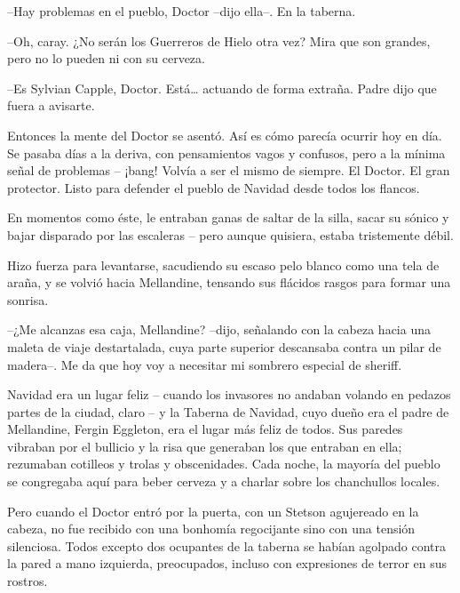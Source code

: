 --Hay problemas en el pueblo, Doctor --dijo ella--. En la taberna.

--Oh, caray. ¿No serán los Guerreros de Hielo otra vez? Mira que son grandes, pero no lo pueden ni con su cerveza.

--Es Sylvian Capple, Doctor. Está… actuando de forma extraña. Padre dijo que fuera a avisarte.

Entonces la mente del Doctor se asentó. Así es cómo parecía ocurrir hoy en día. Se pasaba días a la deriva, con pensamientos vagos y confusos, pero a la mínima señal de problemas – ¡bang! Volvía a ser el mismo de siempre. El Doctor. El gran protector. Listo para defender el pueblo de Navidad desde todos los flancos.

En momentos como éste, le entraban ganas de saltar de la silla, sacar su sónico y bajar disparado por las escaleras – pero aunque quisiera, estaba tristemente débil.

Hizo fuerza para levantarse, sacudiendo su escaso pelo blanco como una tela de araña, y se volvió hacia Mellandine, tensando sus flácidos rasgos para formar una sonrisa.

--¿Me alcanzas esa caja, Mellandine? --dijo, señalando con la cabeza hacia una maleta de viaje destartalada, cuya parte superior descansaba contra un pilar de madera--. Me da que hoy voy a necesitar mi sombrero especial de sheriff.



\mbox{}



\centerline{ \Huge *}



\mbox{}



Navidad era un lugar feliz – cuando los invasores no andaban volando en pedazos partes de la ciudad, claro – y la Taberna de Navidad, cuyo dueño era el padre de Mellandine, Fergin Eggleton, era el lugar más feliz de todos. Sus paredes vibraban por el bullicio y la risa que generaban los que entraban en ella; rezumaban cotilleos y trolas y obscenidades. Cada noche, la mayoría del pueblo se congregaba aquí para beber cerveza y a charlar sobre los chanchullos locales.

Pero cuando el Doctor entró por la puerta, con un Stetson agujereado en la cabeza, no fue recibido con una bonhomía regocijante sino con una tensión silenciosa. Todos excepto dos ocupantes de la taberna se habían agolpado contra la pared a mano izquierda, preocupados, incluso con expresiones de terror en sus rostros.

